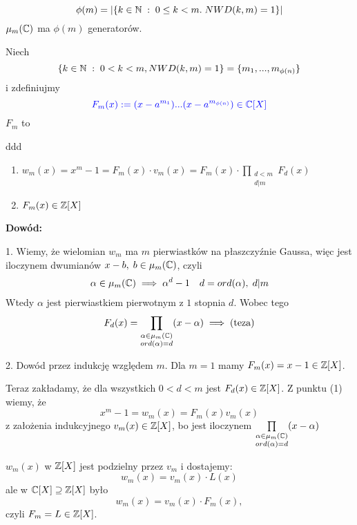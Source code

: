 $$\phi(m)=|\{k\in\mathbb{N}\;:\;0\leq k<m.\;NWD(k,m)=1\}|$$
$\mu_m(\mathbb{C})$ ma $\phi(m)$ generatorów.

Niech
$$\{k\in\mathbb{N}\;:\;0<k<m, NWD(k, m)=1\}=\{m_1,...,m_{\phi(n)}\}$$
i zdefiniujmy
$$\color{blue}F_m(x):=(x-a^{m_1})...(x-a^{m_{\phi(n)}})\in\mathbb{C}[X]$$
$F_m$ to 

\begin{uwaga}[$F_m\in\Z\begin{bmatrix}X\end{bmatrix}$]{\color{back}ddd}
    \begin{enumerate}
        \item $w_m(x)=x^m-1=F_m(x)\cdot v_m(x)=F_m(x)\cdot\prod\limits_{\substack{d<m\\d|m}}F_d(x)$
        \item $F_m(x)\in\mathbb{Z}[X]$
    \end{enumerate}
\end{uwaga}

\textbf{Dowód:}

1. Wiemy, że wielomian $w_m$ ma $m$ pierwiastków na płaszczyźnie Gaussa, więc jest iloczynem dwumianów $x-b,\;b\in\mu_m(\mathbb{C})$, czyli
\begin{align*}
    \alpha\in\mu_m(\mathbb{C})\implies\alpha^d-1\quad d=ord(\alpha),\;d|m
\end{align*}
Wtedy $\alpha$ jest pierwiastkiem pierwotnym z $1$ stopnia $d$. Wobec tego
$$F_d(x)=\prod\limits_{\substack{\alpha\in\mu_m(\mathbb{C})\\ord(\alpha)=d}}(x-\alpha)\implies (\text{teza})$$

2. Dowód przez indukcję względem $m$. Dla $m=1$ mamy $F_m(x)=x-1\in\mathbb{Z}[X]$. 

Teraz zakładamy, że dla wszystkich $0<d<m$ jest $F_d(x)\in\mathbb{Z}[X]$. Z punktu (1) wiemy, że
$$x^m-1=w_m(x)=F_m(x)v_m(x)$$
z założenia indukcyjnego $v_m(x)\in\mathbb{Z}[X]$, bo jest iloczynem $\prod\limits_{\substack{\alpha\in\mu_m(\mathbb{C})\\ord(\alpha)=d}}(x-\alpha)$

$w_m(x)$ w $\mathbb{Z}[X]$ jest podzielny przez $v_m$ i dostajemy:
$$w_m(x)=v_m(x)\cdot L(x)$$
ale w $\mathbb{C}[X]\supseteq\mathbb{Z}[X]$ było
$$w_m(x)=v_m(x)\cdot F_m(x),$$
czyli $F_m=L\in\mathbb{Z}[X]$.

